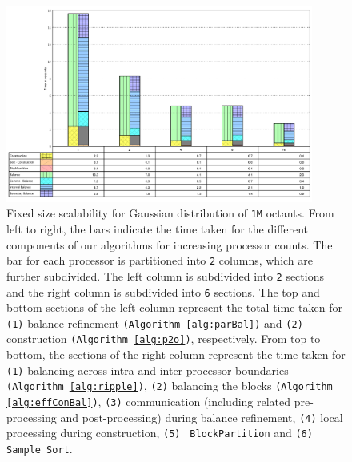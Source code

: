 \begin{figure}
  \begin{center}
    \includegraphics[width=0.9\textwidth]{images/fs1}
  \end{center}
  \caption{Fixed size scalability for Gaussian distribution of {\tt1M}
  octants. From left to right, the bars indicate the time taken for
  the different components of our algorithms for increasing processor
  counts. The bar for each processor is partitioned into {\tt2}
  columns, which are further subdivided. The left column is subdivided
  into {\tt2} sections and the right column is subdivided into {\tt6}
  sections. The top and bottom sections of the left column represent
  the total time taken for {\tt(1)} balance refinement {\tt(Algorithm
  \ref{alg:parBal})} and {\tt(2)} construction {\tt(Algorithm
  \ref{alg:p2o})}, respectively. From top to bottom, the sections of
  the right column represent the time taken for {\tt(1)} balancing
  across intra and inter processor boundaries {\tt(Algorithm
  \ref{alg:ripple})}, {\tt(2)} balancing the blocks {\tt(Algorithm
  \ref{alg:effConBal})}, {\tt(3)} communication (including related
  pre-processing and post-processing) during balance refinement,
  {\tt(4)} local processing during construction, {\tt(5)} {\tt
  BlockPartition} and {\tt(6)} {\tt Sample Sort}.}
  \label{fig:fsS}
\end{figure}

